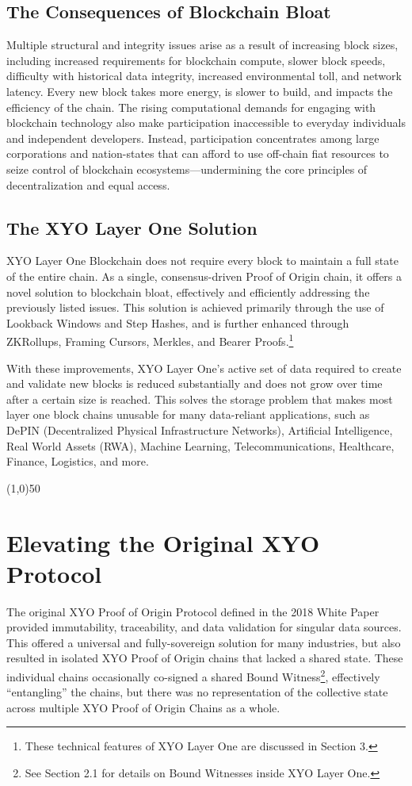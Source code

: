 \documentclass{article}
\begin{document}
\subsection{The Consequences of Blockchain Bloat}
Multiple structural and integrity issues arise as a result of increasing block
sizes, including increased requirements for blockchain compute, slower block
speeds, difficulty with historical data integrity, increased environmental
toll, and network latency. Every new block takes more energy, is slower to
build, and impacts the efficiency of the chain. The rising computational
demands for engaging with blockchain technology also make participation
inaccessible to everyday individuals and independent developers. Instead,
participation concentrates among large corporations and nation-states that can
afford to use off-chain fiat resources to seize control of blockchain
ecosystems—undermining the core principles of decentralization and equal
access.

\subsection{The XYO Layer One Solution}
XYO Layer One Blockchain does not require every block to maintain a full state
of the entire chain. As a single, consensus-driven Proof of Origin chain, it
offers a novel solution to blockchain bloat, effectively and efficiently
addressing the previously listed issues. This solution is achieved primarily
through the use of Lookback Windows and Step Hashes, and is further enhanced
through ZKRollups, Framing Cursors, Merkles, and Bearer Proofs.\footnote{These
    technical features of XYO Layer One are discussed in Section 3.}

With these improvements, XYO Layer One's active set of data required to create
and validate new blocks is reduced substantially and does not grow over time
after a certain size is reached. This solves the storage problem that makes
most layer one block chains unusable for many data-reliant applications, such
as DePIN (Decentralized Physical Infrastructure Networks), Artificial
Intelligence, Real World Assets (RWA), Machine Learning, Telecommunications,
Healthcare, Finance, Logistics, and more.

\begin{center}
    \line(1,0){50}
\end{center}

\section{Elevating the Original XYO Protocol}
The original XYO Proof of Origin Protocol defined in the 2018 White Paper
provided immutability, traceability, and data validation for singular data
sources. This offered a universal and fully-sovereign solution for many
industries, but also resulted in isolated XYO Proof of Origin chains that
lacked a shared state. These individual chains occasionally co-signed a shared
Bound Witness\footnote{See Section 2.1 for details on Bound Witnesses inside
    XYO Layer One.}, effectively “entangling” the chains, but there was no
representation of the collective state across multiple XYO Proof of Origin
Chains as a whole.
\end{document}
